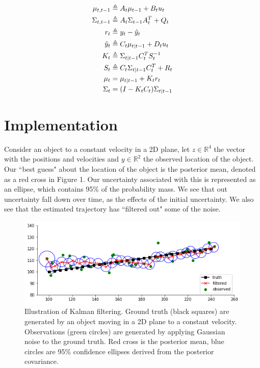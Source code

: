 \documentclass{article}
\begin{document}
\begin{align}
    \centering
    \mu_{t,t-1} & \triangleq A_{t}\mu_{t-1}+B_{t}u_{t}\\
    \Sigma_{t,t-1} & \triangleq A_{t}\Sigma_{t-1}A_{t}^{T}+Q_{t}\\
    r_{t} &\triangleq y_{t}-\hat{y}_{t}\\
    \hat{y}_{t} &\triangleq  C_{t}\mu_{t|t-1}+D_{t}u_{t}\\
    K_{t}  &\triangleq \Sigma_{t|t-1}C_{t}^{T}S_{t}^{-1}\\
    S_{t}  &\triangleq  C_{t}\Sigma_{t|t-1}C_{t}^{T}+R_{t}\\
    \mu_{t} & = \mu_{t|t-1}+K_{t}r_{t}\\
    \Sigma_{t} & = (I-K_{t}C_{t})\Sigma_{t|t-1} 
\end{align}

\section{Implementation}
Consider an object to a constant velocity in a 2D plane, let $z \in \mathbb{R}^{4}$ the vector with the positions and velocities and $y \in \mathbb{R}^{2}$ the observed location of the object. Our ``best guess" about the location of the object is the posterior mean, denoted as a red cross in Figure 1. Our uncertainty associated with this is represented as an ellipse, which contains 95\% of the probability mass. We see that out uncertainty fall down over time, as the effects of the initial uncertainty. We also see that the estimated trajectory has ``filtered out" some of the noise.


\begin{figure}[h]
\includegraphics[scale=0.4]{kalman_filter.png}
\caption{Illustration of Kalman filtering. Ground truth (black squares) are generated by an object moving in a 2D plane to a constant velocity. Observations (green circles) are generated by applying Gaussian noise to the ground truth. Red cross is the posterior mean, blue circles are 95\% confidence ellipses derived from the posterior covariance.}
\end{figure}
\end{document}
